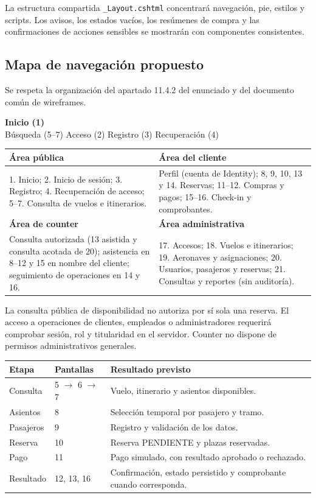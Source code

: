 \documentclass[11pt,a4paper]{article}
\begin{document}
La estructura compartida \texttt{\_Layout.cshtml} concentrará navegación, pie, estilos y scripts. Los avisos, los estados vacíos, los resúmenes de compra y las confirmaciones de acciones sensibles se mostrarán con componentes consistentes.

\subsection{Mapa de navegación propuesto}
Se respeta la organización del apartado 11.4.2 del enunciado y del documento común de wireframes.

\begin{avisobox}
\centering\textbf{Inicio (1)}\\[2pt]
Búsqueda (5--7) \quad Acceso (2) \quad Registro (3) \quad Recuperación (4)
\end{avisobox}
\begin{tabularx}{\textwidth}{@{}XX@{}}
\toprule
\textbf{Área pública} & \textbf{Área del cliente}\\\midrule
1. Inicio; 2. Inicio de sesión; 3. Registro; 4. Recuperación de acceso; 5--7. Consulta de vuelos e itinerarios. & Perfil (cuenta de Identity); 8, 9, 10, 13 y 14. Reservas; 11--12. Compras y pagos; 15--16. Check-in y comprobantes.\\\midrule
\textbf{Área de counter} & \textbf{Área administrativa}\\\midrule
Consulta autorizada (13 asistida y consulta acotada de 20); asistencia en 8--12 y 15 en nombre del cliente; seguimiento de operaciones en 14 y 16. & 17. Accesos; 18. Vuelos e itinerarios; 19. Aeronaves y asignaciones; 20. Usuarios, pasajeros y reservas; 21. Consultas y reportes (sin auditoría).\\\bottomrule
\end{tabularx}

La consulta pública de disponibilidad no autoriza por sí sola una reserva. El acceso a operaciones de clientes, empleados o administradores requerirá comprobar sesión, rol y titularidad en el servidor. Counter no dispone de permisos administrativos generales.

\begin{tabularx}{\textwidth}{@{}p{2cm}p{2cm}X@{}}
\toprule
\textbf{Etapa} & \textbf{Pantallas} & \textbf{Resultado previsto}\\\midrule
Consulta & 5 $\to$ 6 $\to$ 7 & Vuelo, itinerario y asientos disponibles.\\
Asientos & 8 & Selección temporal por pasajero y tramo.\\
Pasajeros & 9 & Registro y validación de los datos.\\
Reserva & 10 & Reserva PENDIENTE y plazas reservadas.\\
Pago & 11 & Pago simulado, con resultado aprobado o rechazado.\\
Resultado & 12, 13, 16 & Confirmación, estado persistido y comprobante cuando corresponda.\\\bottomrule
\end{tabularx}
\end{document}
